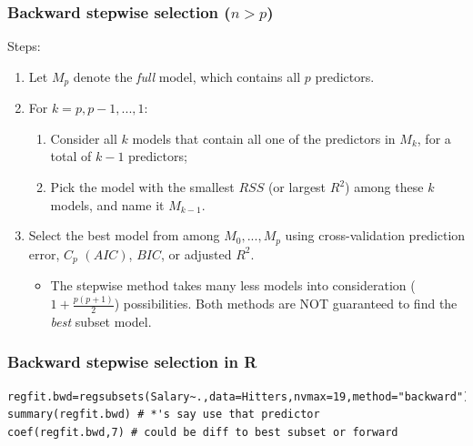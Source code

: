 \documentclass[11pt]{article}
\begin{document}
\subsubsection{Backward stepwise selection ($n>p$)}
\noindent Steps:
\begin{enumerate}
    \item Let $M_p$ denote the \textit{full} model, which contains all $p$ predictors.
    \item For $k=p,p-1,...,1$:
        \begin{enumerate}
            \item Consider all $k$ models that contain all one of the predictors in $M_k$, for a total of $k-1$ predictors;
            \item Pick the model with the smallest $RSS$ (or largest $R^2$) among these $k$ models, and name it $M_{k-1}$.
        \end{enumerate}
    \item Select the best model from among $M_0,...,M_p$ using cross-validation prediction error, $C_p$ $(AIC)$, $BIC$, or adjusted $R^2$.
        \begin{itemize}
            \item The stepwise method takes many less models into consideration ($1 + \frac{p(p+1)}{2}$) possibilities. Both methods are NOT guaranteed to find the \textit{best} subset model.
        \end{itemize}
\end{enumerate}

\subsubsection{Backward stepwise selection in R}
\begin{lstlisting}
regfit.bwd=regsubsets(Salary~.,data=Hitters,nvmax=19,method="backward")
summary(regfit.bwd) # *'s say use that predictor
coef(regfit.bwd,7) # could be diff to best subset or forward
\end{lstlisting}
\end{document}
